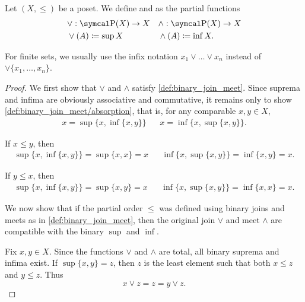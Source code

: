 \begin{definition}\label{def:join_meet}
  Let \( (X, \leq) \) be a poset. We define  and  as the partial functions
  \begin{align*}
    &\lor: \Power(X) \to X
    &&\land: \Power(X) \to X
    \\
    &\lor(A) \coloneqq \sup X
    &&\land(A) \coloneqq \inf X.
  \end{align*}

  For finite sets, we usually use the infix notation \( x_1 \lor \ldots \lor x_n \) instead of \( \lor \{ x_1, \ldots, x_n \} \).
\end{definition}
\begin{proof}
  We first show that \( \lor \) and \( \land \) satisfy \cref{def:binary_join_meet}. Since suprema and infima are obviously associative and commutative, it remains only to show \ref{def:binary_join_meet/absorption}, that is, for any comparable \( x, y \in X \),
  \begin{align*}
    x = \sup \{x, \inf \{ x, y \} \}
    &&
    x = \inf \{x, \sup \{ x, y \} \}.
  \end{align*}

  If \( x \leq y \), then
  \begin{align*}
    \sup \{ x, \inf \{ x, y \} \} = \sup \{ x, x \} = x
    &&
    \inf \{ x, \sup \{ x, y \} \} = \inf \{ x, y \} = x.
  \end{align*}

  If \( y \leq x \), then
  \begin{align*}
    \sup \{ x, \inf \{ x, y \} \} = \sup \{ x, y \} = x
    &&
    \inf \{ x, \sup \{ x, y \} \} = \inf \{ x, x \} = x.
  \end{align*}

  We now show that if the partial order \( \leq \) was defined using binary joins and meets as in \cref{def:binary_join_meet}, then the original join \( \lor \) and meet \( \land \) are compatible with the binary \( \sup \) and \( \inf \).

  Fix \( x, y \in X \). Since the functions \( \lor \) and \( \land \) are total, all binary suprema and infima exist. If \( \sup \{ x, y \} = z \), then \( z \) is the least element such that both \( x \leq z \) and \( y \leq z \). Thus
  \begin{equation*}
    x \lor z = z = y \lor z.
  \end{equation*}


\end{proof}
